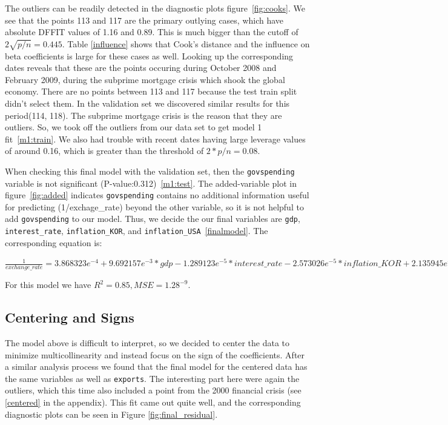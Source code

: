 \documentclass[12pt]{article}
\begin{document}
The outliers can be readily detected in the diagnostic plots 
figure~\ref{fig:cooks}. We see
that the points 113 and 117 are the primary outlying cases, which have
absolute DFFIT values of 1.16 and 0.89. This is much bigger than the cutoff
of $2 \sqrt{p / n} = 0.445$. Table \ref{influence} shows that Cook's distance
and the influence on beta coefficients is large for these cases as well.
Looking up the
corresponding dates reveals that these are the points occuring during
October 2008 and February 2009, during the subprime mortgage crisis
which shook the global economy. There are no points between 113 and 117
because the test train split didn't select them. In the validation set we
discovered similar results for this period(114, 118). The subprime mortgage
crisis is the reason that they are outliers. So, we took off the outliers
from our data set to get model 1 fit~\ref{m1:train}. We also had trouble
with recent dates having large leverage values of around 0.16, which is
greater than the threshold of $2 * p / n = 0.08$.

When checking this final model with the validation set, then the
\texttt{govspending} variable is not
significant (P-value:0.312)~\ref{m1:test}. The added-variable plot in
figure~\ref{fig:added} indicates \texttt{govspending} contains no
additional information useful for predicting (1/exchage\_rate) beyond the
other variable, so it is not helpful to add \texttt{govspending} to our
model. Thus, we decide the our final variables are \texttt{gdp},
\texttt{interest\_rate}, \texttt{inflation\_KOR}, and
\texttt{inflation\_USA}~\ref{finalmodel}. The corresponding equation is:

$\frac{1}{exchange\_rate} = 3.868323e^{-4} + 9.692157e^{-3} * gdp
-1.289123e^{-5} *interest\_rate -2.573026e^{-5} * inflation\_KOR +
2.135945e^{-5}  * inflation\_USA$ 

For this model we have $R^2 = 0.85, MSE = 1.28^{-9}$.

\subsection{Centering and Signs}

The model above is difficult to interpret, so we decided to center the data
to minimize multicollinearity and instead focus on the sign of the
coefficients. After a
similar analysis process we found that the final model
for the centered data has the same variables as well as \texttt{exports}.
The interesting part here were again the outliers, which this time also included
a point from the 2000 financial crisis (see \ref{centered} in the appendix). This fit came out
quite well, and the corresponding diagnostic plots can be seen in 
Figure \ref{fig:final_residual}.
\end{document}
